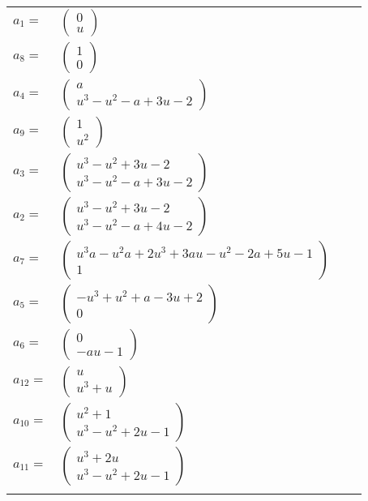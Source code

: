 \documentclass[1p]{elsarticle_modified}
\theoremstyle{definition}
\begin{document}
\begin{tabular}{m{7pt} m{180pt} m{7pt} m{180pt} }
\flushright $a_{1}=$&$\begin{pmatrix}0\\u\end{pmatrix}$ \\
\flushright $a_{8}=$&$\begin{pmatrix}1\\0\end{pmatrix}$ \\
\flushright $a_{4}=$&$\begin{pmatrix}a\\u^3- u^2- a+3 u-2\end{pmatrix}$ \\
\flushright $a_{9}=$&$\begin{pmatrix}1\\u^2\end{pmatrix}$ \\
\flushright $a_{3}=$&$\begin{pmatrix}u^3- u^2+3 u-2\\u^3- u^2- a+3 u-2\end{pmatrix}$ \\
\flushright $a_{2}=$&$\begin{pmatrix}u^3- u^2+3 u-2\\u^3- u^2- a+4 u-2\end{pmatrix}$ \\
\flushright $a_{7}=$&$\begin{pmatrix}u^3 a- u^2 a+2 u^3+3 a u- u^2-2 a+5 u-1\\1\end{pmatrix}$ \\
\flushright $a_{5}=$&$\begin{pmatrix}- u^3+u^2+a-3 u+2\\0\end{pmatrix}$ \\
\flushright $a_{6}=$&$\begin{pmatrix}0\\- a u-1\end{pmatrix}$ \\
\flushright $a_{12}=$&$\begin{pmatrix}u\\u^3+u\end{pmatrix}$ \\
\flushright $a_{10}=$&$\begin{pmatrix}u^2+1\\u^3- u^2+2 u-1\end{pmatrix}$ \\
\flushright $a_{11}=$&$\begin{pmatrix}u^3+2 u\\u^3- u^2+2 u-1\end{pmatrix}$\\&\end{tabular}
\end{document}
